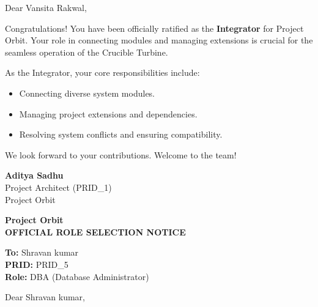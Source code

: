 \documentclass[11pt,a4paper]{article}
\begin{document}
\vspace{10mm}

\noindent Dear Vansita Rakwal,

\vspace{5mm}

\noindent Congratulations! You have been officially ratified as the \textbf{Integrator} for Project Orbit. Your role in connecting modules and managing extensions is crucial for the seamless operation of the Crucible Turbine.

\vspace{5mm}

\noindent As the Integrator, your core responsibilities include:
\begin{itemize}
    \item Connecting diverse system modules.
    \item Managing project extensions and dependencies.
    \item Resolving system conflicts and ensuring compatibility.
\end{itemize}

\vspace{10mm}

\noindent We look forward to your contributions. Welcome to the team!

\vspace{15mm}

\begin{flushright}
    \textbf{Aditya Sadhu} \\
    Project Architect (PRID\_1) \\
    Project Orbit
\end{flushright}

\newpage

\begin{center}
    \color{orbitblue}
    {\huge \textbf{Project Orbit}} \\
    \vspace{5mm}
    {\large \textbf{OFFICIAL ROLE SELECTION NOTICE}}
\end{center}

\vspace{10mm}

\noindent \textbf{To:} Shravan kumar \\
\textbf{PRID:} PRID\_5 \\
\textbf{Role:} DBA (Database Administrator)

\vspace{10mm}

\noindent Dear Shravan kumar,
\end{document}
